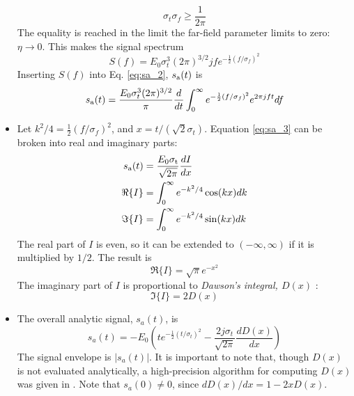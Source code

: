 \documentclass[amsmath,amssymb,aps,prd,10pt,twocolumn,showkeys]{revtex4}
\begin{document}
\begin{itemize}
\begin{equation}
\sigma_t \sigma_f \geq \frac{1}{2\pi}
\end{equation}
The equality is reached in the limit the far-field parameter limits to zero: $\eta \to 0$.  This makes the signal spectrum
\begin{equation}
S(f) = E_0 \sigma_t^3 (2\pi)^{3/2} j f e^{-\frac{1}{2}\left(f/\sigma_f\right)^2} \label{eq:spec}
\end{equation}
Inserting $S(f)$ into Eq. \ref{eq:sa_2}, $s_{\rm a}(t)$ is
\begin{equation}
s_{\rm a}(t) = \frac{E_0 \sigma_t^3 (2\pi)^{3/2}}{\pi} \frac{d}{dt}\int_0^{\infty} e^{-\frac{1}{2}\left(f/\sigma_f\right)^2} e^{2\pi j f t} df \label{eq:sa_3}
\end{equation}
\item Let $k^2/4 = \frac{1}{2}\left(f/\sigma_f\right)^2$, and $x = t/(\sqrt{2}\sigma_t)$.  Equation \ref{eq:sa_3} can be broken into real and imaginary parts:
\begin{align}
s_{\rm a}(t) &= \frac{E_0 \sigma_{\rm t}}{\sqrt{2\pi}}\frac{dI}{dx} \\
\Re\lbrace I \rbrace &= \int_0^{\infty} e^{-k^2/4}\cos(kx) dk \\
\Im\lbrace I \rbrace &= \int_0^{\infty} e^{-k^2/4}\sin(kx) dk
\end{align}
The real part of $I$ is even, so it can be extended to $(-\infty,\infty)$ if it is multiplied by $1/2$.  The result is
\begin{equation}
\Re\lbrace I \rbrace = \sqrt{\pi} e^{-x^2}
\end{equation}
The imaginary part of $I$ is proportional to \textit{Dawson's integral, $D(x)$} \cite{NIST:DLMF}:
\begin{equation}
\Im\lbrace I\rbrace = 2 D(x)
\end{equation}
\item The overall analytic signal, $s_a(t)$, is
\begin{equation}
s_a(t) = -E_0 \left(t e^{-\frac{1}{2}\left(t/\sigma_t\right)^2} - \frac{2 j\sigma_t}{\sqrt{2\pi}} \frac{dD(x)}{dx}\right) \label{eq:sa_4}
\end{equation}
The signal envelope is $|s_a(t)|$.  It is important to note that, though $D(x)$ is not evaluated analytically, a high-precision algorithm for computing $D(x)$ was given in \cite{10.1063/1.4822832}.  Note that $s_a(0) \neq 0$, since $dD(x)/dx = 1 - 2x D(x)$.

\end{itemize}
\end{document}
